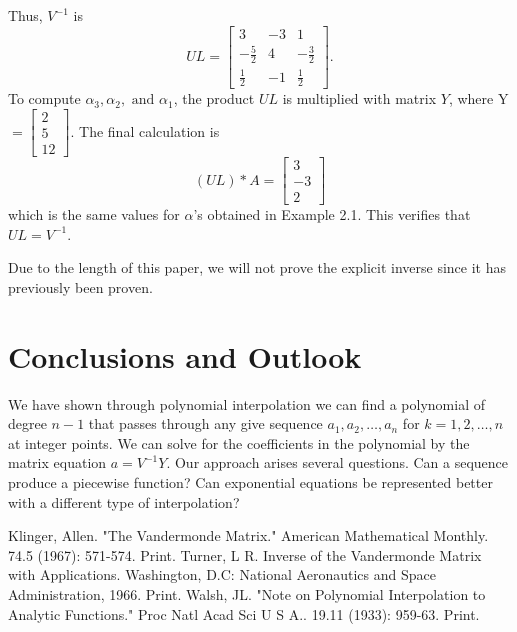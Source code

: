 \documentclass[12pt]{amsart}
\begin{document}
Thus, $V^{-1}$ is
\begin{equation*}
UL=
\left[ {\begin{array}{ccc}
3&-3&1\\
-\frac{5}{2}&4&-\frac{3}{2}\\
\frac{1}{2}&-1&\frac{1}{2}
\end{array} } \right].
\end{equation*}
To compute $\alpha_3, \alpha_2, \text { and } \alpha_1$, the product $UL$ is multiplied with matrix $Y$, where Y
$=\left[ {\begin{array}{c}
2\\
5\\
12
\end{array} } \right].$ The final calculation is
\begin{equation*}(UL)*A = \left[ {\begin{array}{c}
3\\
-3\\
2
\end{array} } \right]
\end{equation*}
which is the same values for $\alpha$'s obtained in Example 2.1. This verifies that $UL=V^{-1}$.
 
Due to the length of this paper, we will not prove the explicit inverse since it has previously been proven.
\section{Conclusions and Outlook}
 
We have shown through polynomial interpolation we can find a polynomial of degree $n-1$ that passes through any give sequence $a_1, a_2,\hdots,a_n$ for $k=1, 2,\hdots, n$ at integer points. We can solve for the coefficients in the polynomial by the matrix equation $a=V^{-1}Y$. Our approach arises several questions. Can a sequence produce a piecewise function? Can exponential equations be represented better with a different type of interpolation?
 
 
\begin{thebibliography}{9}
 Klinger, Allen. "The Vandermonde Matrix." American Mathematical Monthly. 74.5 (1967): 571-574. Print.
 Turner, L R. Inverse of the Vandermonde Matrix with Applications. Washington, D.C: National Aeronautics and Space Administration, 1966. Print.
 Walsh, JL. "Note on Polynomial Interpolation to Analytic Functions." Proc Natl Acad Sci U S A.. 19.11 (1933): 959-63. Print.
\end{thebibliography}
\end{document}

